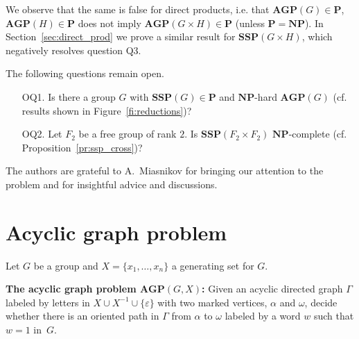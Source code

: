 \documentclass[10pt]{amsart}
\theoremstyle{definition}
\def\P{{\mathbf{P}}}
\def\NP{{\mathbf{NP}}}
\def\SSP{{\mathbf{SSP}}}
\def\AGP{{\mathbf{AGP}}}
\begin{document}
We observe that the same is false for direct products, i.e. that $\AGP(G)\in\P$, $\AGP(H)\in\P$ does not imply $\AGP(G\times H)\in\P$ (unless $\P=\NP$). In Section~\ref{sec:direct_prod}
we prove a similar result for $\SSP(G\times H)$, which negatively resolves question Q3.


The following questions remain open.
\begin{itemize}
\item[OQ1.] Is there a group $G$ with $\SSP(G)\in\P$ and $\NP$-hard $\AGP(G)$ (cf. results shown in Figure~\ref{fi:reductions})?
\item[OQ2.] Let $F_2$ be a free group of rank $2$. Is $\SSP(F_2\times F_2)$ $\NP$-complete (cf. Proposition~\ref{pr:ssp_cross})?
\end{itemize}

The authors are grateful to A.~Miasnikov for bringing our attention to the problem and for insightful advice and discussions.



\section{Acyclic graph problem}\label{sec:agp}
Let $G$ be a group and $X=\{x_1,\ldots,x_n\}$ a generating set for $G$.

%

\medskip
\noindent
{\bf The acyclic graph problem $\AGP(G,X)$\index{$\AGP(G,X)$}:}
Given an acyclic directed graph $\Gamma$ labeled by letters in $X\cup X^{-1}\cup \{\varepsilon\}$ with two marked vertices, $\alpha$ and $\omega$, decide whether there is an oriented path in $\Gamma$ from $\alpha$ to $\omega$ labeled by a word $w$ such that $w=1$ in~$G$.
\end{document}
